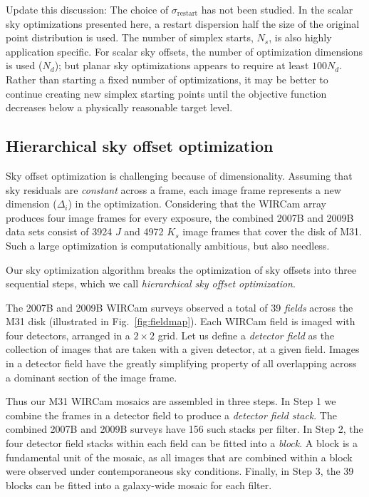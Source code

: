 \documentclass[iop]{emulateapj}
\newcommand{\todo}[1]{\textcolor{RedOrange}{#1}} %
\newcommand{\Fig}[1]{Fig.~\ref{fig:#1}}  %
\begin{document}
\todo{Update this discussion: The choice of $\sigma_\mathrm{restart}$ has not been studied.
In the scalar sky optimizations presented here, a restart dispersion half the size of the original point distribution is used.
The number of simplex starts, $N_s$, is also highly application specific.
For scalar sky offsets, the number of optimization dimensions is used ($N_d$); but planar sky optimizations appears to require at least $100N_d$.
Rather than starting a fixed number of optimizations, it may be better to continue creating new simplex starting points until the objective function decreases below a physically reasonable target level.}

\subsection{Hierarchical sky offset optimization}
\label{sec:hierarchical_algo}

Sky offset optimization is challenging because of dimensionality. Assuming that sky residuals are \emph{constant} across a frame, each image frame represents a new dimension ($\Delta_i$) in the optimization. Considering that the WIRCam array produces four image frames for every exposure, the combined 2007B and 2009B data sets consist of 3924 $J$ and 4972 $K_s$ image frames that cover the disk of M31. Such a large optimization is computationally ambitious, but also needless.

Our sky optimization algorithm breaks the optimization of sky offsets into three sequential steps, which we call \emph{hierarchical sky offset optimization}.

The 2007B and 2009B WIRCam surveys observed a total of 39 \emph{fields} across the M31 disk (illustrated in \Fig{fieldmap}).
Each WIRCam field is imaged with four detectors, arranged in a $2\times 2$ grid.
Let us define a \emph{detector field} as the collection of images that are taken with a given detector, at a given field.
Images in a detector field have the greatly simplifying property of all overlapping across a dominant section of the image frame.

Thus our M31 WIRCam mosaics are assembled in three steps.
In Step 1 we combine the frames in a detector field to produce a \emph{detector field stack}.
The combined 2007B and 2009B surveys have 156 such stacks per filter.
In Step 2, the four detector field stacks within each field can be fitted into a \emph{block}.
A block is a fundamental unit of the mosaic, as all images that are combined within a block were observed under contemporaneous sky conditions.
Finally, in Step 3, the 39 blocks can be fitted into a galaxy-wide mosaic for each filter.
\end{document}
